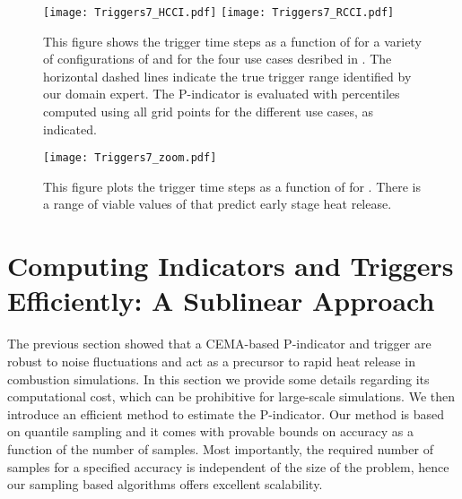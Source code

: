 \documentclass[final]{siamltex}
\newcommand{\pmetric}{P}
\begin{document}
\begin{figure}[htpb]
\centering
\texttt{[image: Triggers7\_HCCI.pdf]}
\texttt{[image: Triggers7\_RCCI.pdf]}
\caption{\label{fig:Thresholds} 
This figure shows the trigger time steps as a function of
 for a variety of configurations of  and 
for the four use cases desribed in .  
The horizontal dashed lines indicate the true trigger range identified by our
domain expert.  The \pmetric-indicator is evaluated with percentiles computed
using all  grid points for the different use cases, as indicated. } 
\end{figure}

\begin{figure}[t]
\centering
\texttt{[image: Triggers7\_zoom.pdf]}
\caption{\label{fig:Triggers_thresh} This figure plots the trigger time steps as a function of
 for .
  There is a range of viable values of  that
  predict early stage heat release.
}
\end{figure}
 
\section{Computing Indicators and Triggers Efficiently: A Sublinear Approach}
\label{sec:sample} 
The previous section showed that a CEMA-based \pmetric-indicator and
trigger are robust to noise fluctuations and act as a precursor to rapid heat
release in combustion simulations. In this section we provide some details
regarding its computational cost, which can be prohibitive for large-scale
simulations.  We then introduce an efficient method  to estimate the
\pmetric-indicator. Our method is based on quantile sampling and it comes with
provable bounds on accuracy as a function of the number of samples.  Most
importantly,  the required number of samples for a specified accuracy is
independent of  the size of the problem, hence our sampling based algorithms
offers  excellent scalability. 
\end{document}
